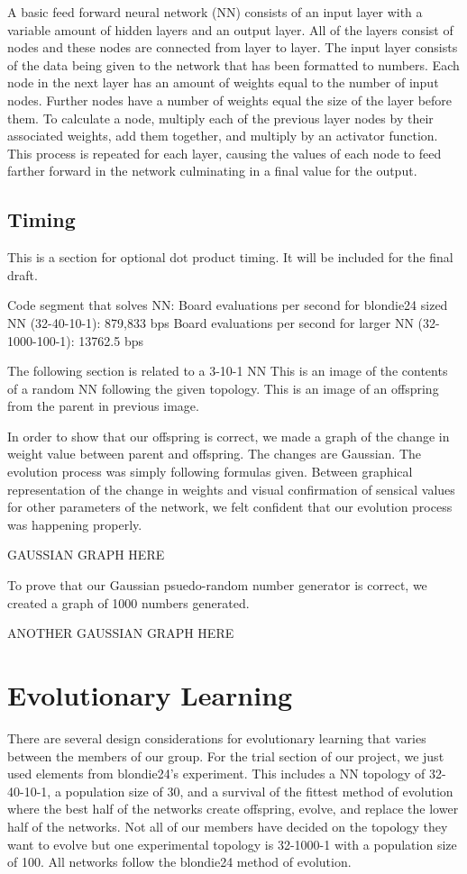 \documentclass{article}
\begin{document}
A basic feed forward neural network (NN) consists of an input layer
with a variable amount of hidden layers and an output layer. All of the layers
consist of nodes and these nodes are connected from layer to layer. The input
layer consists of the data being given to the network that has been formatted
to numbers. Each node in the next layer has an amount of weights equal to the
number of input nodes. Further nodes have a number of weights equal the size of
the layer before them. To calculate a node, multiply each of the previous layer
nodes by their associated weights, add them together, and multiply by an
activator function. This process is repeated for each layer, causing the values
of each node to feed farther forward in the network culminating in a final
value for the output.

\subsection{Timing}
This is a section for optional dot product timing. It
will be included for the final draft.

Code segment that solves NN:
Board evaluations per second for blondie24 sized NN (32-40-10-1): 879,833 bps
Board evaluations per second for larger NN (32-1000-100-1): 13762.5 bps

The following section is related to a 3-10-1 NN This is an image of the contents of a random
NN following the given topology.  This is an image of an offspring from the
parent in previous image.

In order to show that our offspring is correct, we
made a graph of the change in weight value between parent and offspring. The
changes are Gaussian. The evolution process was simply following formulas
given. Between graphical representation of the change in weights and visual
confirmation of sensical values for other parameters of the network, we felt
confident that our evolution process was happening properly.

 GAUSSIAN GRAPH HERE

To prove that our Gaussian psuedo-random number generator is correct, we
created a graph of 1000 numbers generated.

 ANOTHER GAUSSIAN GRAPH HERE

\section{Evolutionary Learning}

There are several design considerations for evolutionary
learning that varies between the members of our group. For the trial section of
our project, we just used elements from blondie24’s experiment. This includes a
NN topology of 32-40-10-1, a population size of 30, and a survival of the
fittest method of evolution where the best half of the networks create
offspring, evolve, and replace the lower half of the networks. Not all of our
members have decided on the topology they want to evolve but one experimental
topology is 32-1000-1 with a population size of 100. All networks follow the
blondie24 method of evolution.
\end{document}
